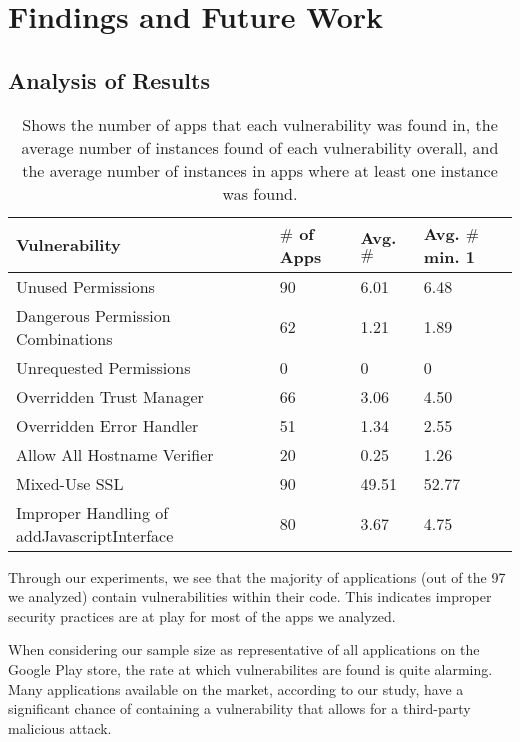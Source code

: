 \section{Findings and Future Work}
\label{sec:relwork}

\subsection{Analysis of Results}
\begin{table}[h!]
    \centering
    \begin{tabular}{| m{4cm} | m{0.75cm}| m{0.75cm} | m{0.75cm} |} \hline
        Vulnerability & $\#$ of Apps & Avg. $\#$ & Avg. $\#$ min. 1\\ \hline
        Unused Permissions & 90 & 6.01 & 6.48\\ \hline
        Dangerous Permission Combinations & 62 & 1.21 & 1.89\\ \hline            
        Unrequested Permissions & 0 & 0 & 0\\ \hline
        Overridden Trust Manager & 66 & 3.06 & 4.50\\ \hline
        Overridden Error Handler & 51  & 1.34 & 2.55\\ \hline
        Allow All Hostname Verifier & 20 & 0.25 & 1.26\\ \hline
        Mixed-Use SSL& 90 & 49.51 & 52.77 \\ \hline
        Improper Handling of addJavascriptInterface & 80 & 3.67 & 4.75 \\ \hline
    \end{tabular}
    \caption{Shows the number of apps that each vulnerability was found in, the average number of instances found of each vulnerability overall, and the average number of instances in apps where at least one instance was found.}
    \label{tab:my_label}
\end{table}

Through our experiments, we see that the majority of applications
(out of the 97 we analyzed) contain vulnerabilities within their
code. This indicates improper security practices are at play for 
most of the apps we analyzed.

When considering our sample size as representative of all 
applications on the Google Play store, the rate at which 
vulnerabilites are found is quite alarming. Many applications
available on the market, according to our study, have a significant 
chance of containing a vulnerability that allows for a third-party 
malicious attack.

